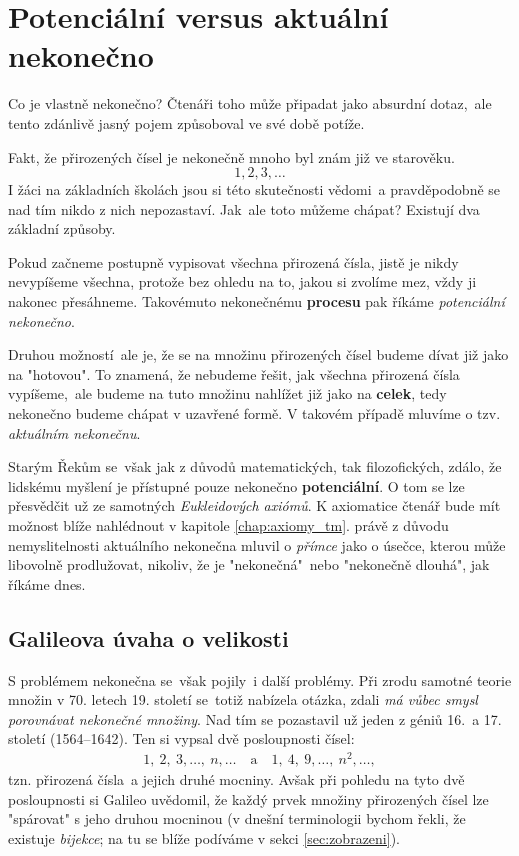 \section{Potenciální versus aktuální nekonečno}\label{sec:pot_vs_akt_nekonecno}

Co je vlastně nekonečno? Čtenáři toho může připadat jako absurdní dotaz,~ale tento zdánlivě jasný pojem způsoboval ve své době potíže.\par
Fakt, že přirozených čísel je nekonečně mnoho byl znám již ve starověku.
\begin{equation*}
1,2,3,\dots
\end{equation*}
I žáci na základních školách jsou si této skutečnosti vědomi~a pravděpodobně se nad tím nikdo z nich nepozastaví. Jak~ale toto můžeme chápat? Existují dva základní způsoby.\par
Pokud začneme postupně vypisovat všechna přirozená čísla, jistě je nikdy nevypíšeme všechna, protože bez ohledu na to, jakou si zvolíme mez, vždy ji nakonec přesáhneme. Takovémuto nekonečnému \textbf{procesu} pak říkáme \emph{potenciální nekonečno}.\par
Druhou možností~ale je, že se na množinu přirozených čísel budeme dívat již jako na "hotovou". To znamená, že nebudeme řešit, jak všechna přirozená čísla vypíšeme,~ale budeme na tuto množinu nahlížet již jako na \textbf{celek}, tedy nekonečno budeme chápat v uzavřené formě. V takovém případě mluvíme o tzv. \emph{aktuálním nekonečnu}.
\medskip

Starým Řekům se~však jak z důvodů matematických, tak filozofických, zdálo, že lidskému myšlení je přístupné pouze nekonečno \textbf{potenciální}. O tom se lze přesvědčit už ze samotných \emph{Eukleidových axiómů}. K axiomatice čtenář bude mít možnost blíže nahlédnout v kapitole \ref{chap:axiomy_tm}.  právě z důvodu nemyslitelnosti aktuálního nekonečna mluvil o \emph{přímce} jako o úsečce, kterou může libovolně prodlužovat, nikoliv, že je "nekonečná"~nebo "nekonečně dlouhá", jak říkáme dnes.

\subsection{Galileova úvaha o velikosti}
\label{subsec:galileo}

S problémem nekonečna se~však pojily~i další problémy. Při zrodu samotné teorie množin v 70. letech 19. století se~totiž nabízela otázka, zdali \emph{má vůbec smysl porovnávat nekonečné množiny}. Nad tím se pozastavil už jeden z géniů 16.~a 17. století  (1564--1642). Ten si vypsal dvě posloupnosti čísel:
\begin{align*}
1,\ 2,\ 3,\dots,\ n,\dots \quad \text{a} \quad 1,\ 4,\ 9,\dots,\ n^2,\dots ,
\end{align*}
tzn. přirozená čísla~a jejich druhé mocniny. Avšak při pohledu na tyto dvě posloupnosti si Galileo uvědomil, že každý prvek množiny přirozených čísel lze "spárovat" s jeho druhou mocninou (v dnešní terminologii bychom řekli, že existuje \emph{bijekce}; na tu se blíže podíváme v sekci \ref{sec:zobrazeni}).

